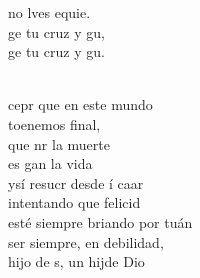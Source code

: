 \documentclass[12pt]{article}
\begin{document}
\begin{multicols*}{2}
\begin{cancion}
\begin{chorus}
	no lves equie. \\
	ge tu cruz y gu, \\
	ge tu cruz y gu. \\
	\end{chorus}%
	\jump\\
	cepr que en este mundo \\
	toenemos final, \\
	que nr la muerte \\
	es gan la vida  \\
	ysí resucr desde í caar\\
	intentando que  felicid\\
	esté siempre briando por tuán\\
	 ser siempre, en debilidad, \\
	 hijo de s, un hijde Dio\\
\end{cancion}%


\end{multicols*}
\end{document}
